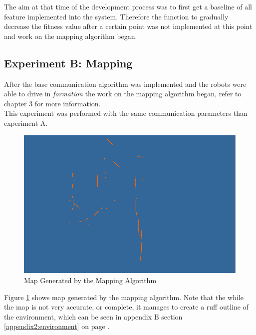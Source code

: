 The aim at that time of the development process was to first get a baseline of all feature implemented into the system.
Therefore the function to gradually decrease the fitness value after a certain point was not implemented at this point and work on the mapping algorithm began.

\subsection{Experiment B: Mapping}
After the base  communication algorithm was implemented and the robots were able to drive in \textit{formation} the work on the mapping algorithm began, refer to chapter 3 for more information. \\

This experiment was performed with the same communication parameters than experiment A. 

\begin{figure}[h]
\centering
\includegraphics[scale=0.5]{Chapter4/images/map1.png}
\caption{Map Generated by the Mapping Algorithm}
\label{fig:map1}
\end{figure}

Figure \ref{fig:map1} shows map generated by the mapping algorithm.
Note that the while the map is not very accurate, or complete, it manages to create a ruff outline of the environment, which can be seen in appendix B section \ref{appendix2:environment} on page \pageref{appendix2:environment}. \\

